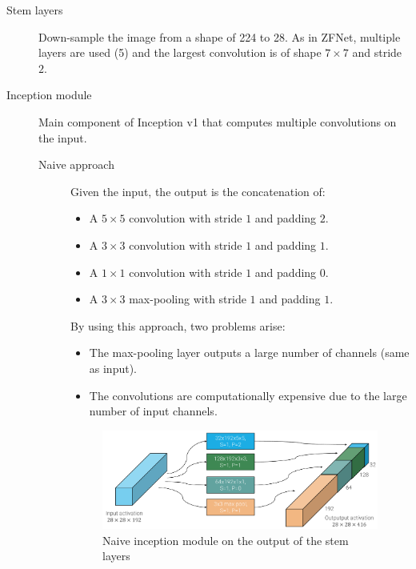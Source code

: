 \begin{description}
    \item[Stem layers]
        Down-sample the image from a shape of 224 to 28.
        As in ZFNet, multiple layers are used (5) and the largest convolution is of shape $7 \times 7$ and stride $2$.

    \item[Inception module] 
        Main component of Inception v1 that computes multiple convolutions on the input.

        \begin{description}
            \item[Naive approach] 
                Given the input, the output is the concatenation of:
                \begin{itemize}
                    \item A $5 \times 5$ convolution with stride $1$ and padding $2$.
                    \item A $3 \times 3$ convolution with stride $1$ and padding $1$.
                    \item A $1 \times 1$ convolution with stride $1$ and padding $0$.
                    \item A $3 \times 3$ max-pooling with stride $1$ and padding $1$.
                \end{itemize} 

                By using this approach, two problems arise:
                \begin{itemize}
                    \item The max-pooling layer outputs a large number of channels (same as input).
                    \item The convolutions are computationally expensive due to the large number of input channels.
                \end{itemize}

                \begin{figure}[H]
                    \centering
                    \includegraphics[width=0.7\linewidth]{./img/_naive_inception.pdf}
                    \caption{Naive inception module on the output of the stem layers}
                \end{figure}
                

\end{description}
\end{description}
